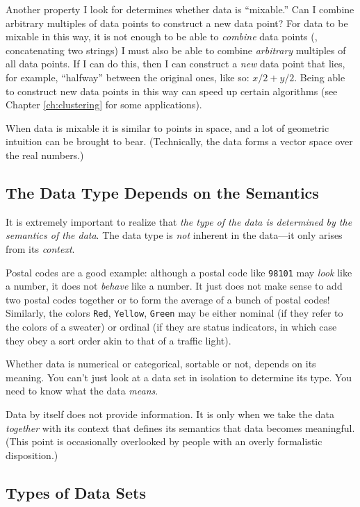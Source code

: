 Another property I look for determines whether data is ``mixable.''
Can I combine arbitrary multiples of data points to construct a new
data point?  For data to be mixable in this way, it is not enough to
be able to \emph{combine} data points (\eg, concatenating two strings)
I must also be able to combine \emph{arbitrary} multiples of all data
points.  If I can do this, then I can construct a \emph{new} data point
that lies, for example, ``halfway'' between the original ones, like
so: $x/2 + y/2$. Being able to construct new data points in this way
can speed up certain algorithms (see Chapter \ref{ch:clustering} for
some applications).

When data is mixable it is similar to points in space, and a lot of
geometric intuition can be brought to bear.  (Technically, the data
forms a vector space over the real numbers.)


\subsection{The Data Type Depends on the Semantics}

It is extremely important to realize that \emph{the type of the data
  is determined by the semantics of the data}. The data type is
\emph{not} inherent in the data---it only arises from its
\emph{context}.

Postal codes are a good example: although a postal code like
\texttt{98101} may \emph{look} like a number, it does not
\emph{behave} like a number. It just does not make sense to add two
postal codes together or to form the average of a bunch of postal
codes! Similarly, the colors \texttt{Red}, \texttt{Yellow},
\texttt{Green} may be either nominal (if they refer to the colors of a
sweater) or ordinal (if they are status indicators, in which case they
obey a sort order akin to that of a traffic light).

Whether data is numerical or categorical, sortable or not, depends on
its meaning. You can't just look at a data set in isolation to
determine its type. You need to know what the data \emph{means}.

Data by itself does not provide information. It is only when we take
the data \emph{together} with its context that defines its semantics
that data becomes meaningful. (This point is occasionally overlooked
by people with an overly formalistic disposition.)

\subsection{Types of Data Sets}

